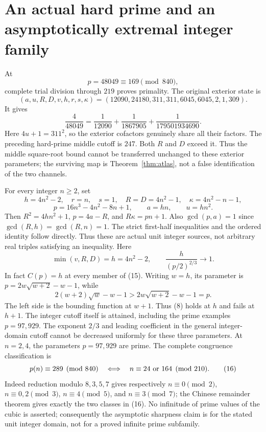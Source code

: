 \section{An actual hard prime and an asymptotically extremal integer family}
At
\[
 \boxed{p=48049\equiv169\pmod{840}},
\]
complete trial division through $219$ proves primality. The original exterior
state is
\[
 \boxed{(a,u,R,D,v,h,r,s,\kappa)
 =(12090,24180,311,311,6045,6045,2,1,309).}                \tag{14}
\]
It gives
\[
 \boxed{\frac4{48049}=\frac1{12090}+\frac1{1867905}
 +\frac1{179501934690}.}
\]
Here $4u+1=311^2$, so the exterior cofactors genuinely share all their factors.
The preceding hard-prime middle cutoff is $247$. Both $R$ and $D$ exceed it.
Thus the middle square-root bound cannot be transferred unchanged to these
exterior parameters; the surviving map is Theorem~\ref{thm:atlas}, not a false
identification of the two channels.

For every integer $n\ge2$, set
\[
 h=4n^2-2,\quad r=n,\quad s=1,\quad
 R=D=4n^2-1,\quad\kappa=4n^2-n-1,
\]
\[
 p=16n^3-4n^2-8n+1,\qquad a=hn,\qquad u=hn^2.
                                                               \tag{15}
\]
Then $R^2=4hn^2+1$, $p=4a-R$, and $R\kappa=pn+1$.
Also $\gcd(p,a)=1$ since $\gcd(R,h)=\gcd(R,n)=1$.
The strict first-half inequalities and the ordered identity follow directly.
Thus these are actual unit integer sources, not arbitrary real triples satisfying
an inequality. Here
\[
 \min(v,R,D)=h=4n^2-2,
 \qquad \frac{h}{(p/2)^{2/3}}\longrightarrow1.
\]
In fact $C(p)=h$ at every member of (15). Writing $w=h$, its parameter is
$p=2w\sqrt{w+2}-w-1$, while
\[
 2(w+2)\sqrt w-w-1>2w\sqrt{w+2}-w-1=p.
\]
The left side is the bounding function at $w+1$. Thus (8) holds at $h$ and fails
at $h+1$. The integer cutoff itself is attained, including the prime examples
$p=97,929$.
The exponent $2/3$ and leading coefficient in the general integer-domain cutoff
cannot be decreased uniformly for these three parameters. At $n=2,4$, the
parameters $p=97,929$ are prime.  The complete congruence classification is
\[
 p(n)\equiv289\pmod{840}
 \quad\Longleftrightarrow\quad
 n\equiv24\ \hbox{or}\ 164\pmod{210}.                 \tag{16}
\]
Indeed reduction modulo $8,3,5,7$ gives respectively
$n\equiv0\pmod2$, $n\equiv0,2\pmod3$, $n\equiv4\pmod5$, and
$n\equiv3\pmod7$; the Chinese remainder theorem gives exactly the two
classes in (16).  No infinitude of prime values of the cubic is asserted;
consequently the asymptotic sharpness claim is for the stated unit integer
domain, not for a proved infinite prime subfamily.

